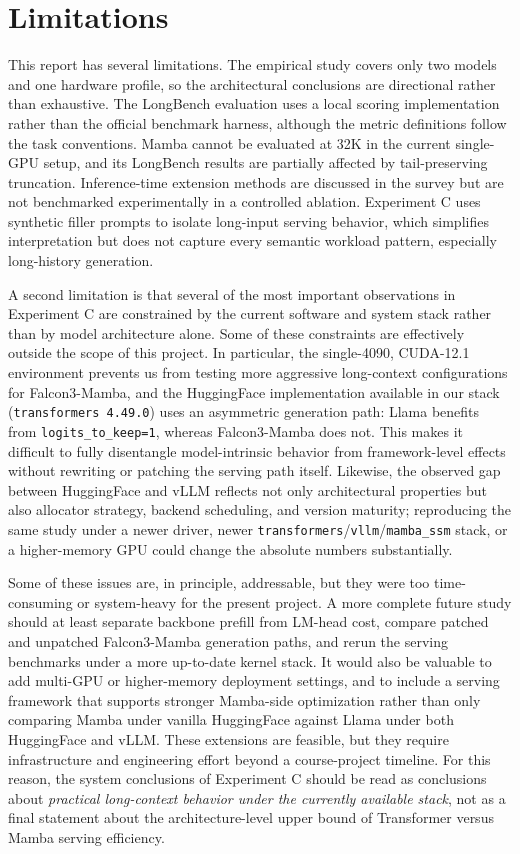 \documentclass{article}
\begin{document}
\section{Limitations}
This report has several limitations. The empirical study covers only two models and one hardware profile, so the architectural conclusions are directional rather than exhaustive. The LongBench evaluation uses a local scoring implementation rather than the official benchmark harness, although the metric definitions follow the task conventions. Mamba cannot be evaluated at 32K in the current single-GPU setup, and its LongBench results are partially affected by tail-preserving truncation. Inference-time extension methods are discussed in the survey but are not benchmarked experimentally in a controlled ablation. Experiment C uses synthetic filler prompts to isolate long-input serving behavior, which simplifies interpretation but does not capture every semantic workload pattern, especially long-history generation.

A second limitation is that several of the most important observations in Experiment C are constrained by the current software and system stack rather than by model architecture alone. Some of these constraints are effectively outside the scope of this project. In particular, the single-4090, CUDA-12.1 environment prevents us from testing more aggressive long-context configurations for Falcon3-Mamba, and the HuggingFace implementation available in our stack (\texttt{transformers 4.49.0}) uses an asymmetric generation path: Llama benefits from \texttt{logits\_to\_keep=1}, whereas Falcon3-Mamba does not. This makes it difficult to fully disentangle model-intrinsic behavior from framework-level effects without rewriting or patching the serving path itself. Likewise, the observed gap between HuggingFace and vLLM reflects not only architectural properties but also allocator strategy, backend scheduling, and version maturity; reproducing the same study under a newer driver, newer \texttt{transformers}/\texttt{vllm}/\texttt{mamba\_ssm} stack, or a higher-memory GPU could change the absolute numbers substantially.

Some of these issues are, in principle, addressable, but they were too time-consuming or system-heavy for the present project. A more complete future study should at least separate backbone prefill from LM-head cost, compare patched and unpatched Falcon3-Mamba generation paths, and rerun the serving benchmarks under a more up-to-date kernel stack. It would also be valuable to add multi-GPU or higher-memory deployment settings, and to include a serving framework that supports stronger Mamba-side optimization rather than only comparing Mamba under vanilla HuggingFace against Llama under both HuggingFace and vLLM. These extensions are feasible, but they require infrastructure and engineering effort beyond a course-project timeline. For this reason, the system conclusions of Experiment C should be read as conclusions about \emph{practical long-context behavior under the currently available stack}, not as a final statement about the architecture-level upper bound of Transformer versus Mamba serving efficiency.
\end{document}
